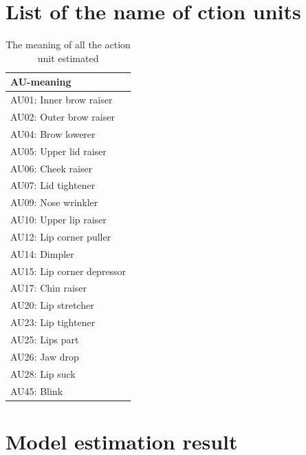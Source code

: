 \documentclass{monashthesis}
\begin{document}
\hypertarget{list-of-the-name-of-ction-units}{%
\section{List of the name of ction units}\label{list-of-the-name-of-ction-units}}

\begin{table}[ht]
\begin{center}
\caption{\label{tab:au_meaning} The meaning of all the action unit estimated}
\begin{tabular}{l}
\toprule
AU-meaning \\
\midrule
AU01: Inner brow raiser \\
AU02: Outer brow raiser \\
AU04: Brow lowerer \\
AU05: Upper lid raiser \\
AU06: Cheek raiser \\
AU07: Lid tightener \\
AU09: Nose wrinkler \\
AU10: Upper lip raiser \\
AU12: Lip corner puller \\
AU14: Dimpler \\
AU15: Lip corner depressor \\
AU17: Chin raiser \\
AU20: Lip stretcher \\
AU23: Lip tightener \\
AU25: Lips part \\
AU26: Jaw drop \\
AU28: Lip suck \\
AU45: Blink \\
\bottomrule
\end{tabular}
\end{center}
\end{table}

\hypertarget{model-estimation-result}{%
\section{Model estimation result}\label{model-estimation-result}}
\end{document}
